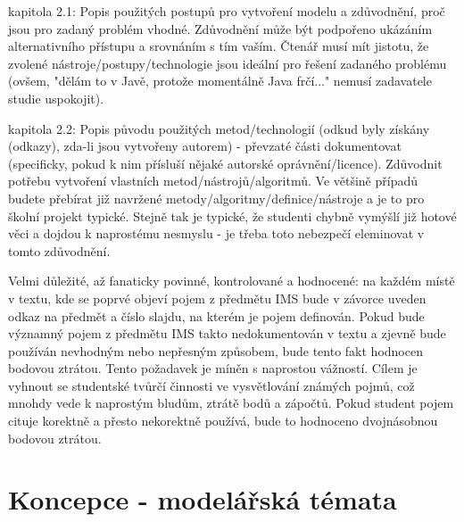 \documentclass[a4paper,11pt]{article}
\begin{document}
kapitola 2.1: Popis použitých postupů pro vytvoření modelu a zdůvodnění, proč jsou pro zadaný problém vhodné. Zdůvodnění může být podpořeno ukázáním alternativního přístupu a srovnáním s tím vaším. Čtenář musí mít jistotu, že zvolené nástroje/postupy/technologie jsou ideální pro řešení zadaného problému (ovšem, "dělám to v Javě, protože momentálně Java frčí..." nemusí zadavatele studie uspokojit).

kapitola 2.2: Popis původu použitých metod/technologií (odkud byly získány (odkazy), zda-li jsou vytvořeny autorem) - převzaté části dokumentovat (specificky, pokud k nim přísluší nějaké autorské oprávnění/licence). Zdůvodnit potřebu vytvoření vlastních metod/nástrojů/algoritmů. Ve většině případů budete přebírat již navržené metody/algoritmy/definice/nástroje a je to pro školní projekt typické. Stejně tak je typické, že studenti chybně vymýšlí již hotové věci a dojdou k naprostému nesmyslu - je třeba toto nebezpečí eleminovat v tomto zdůvodnění.

Velmi důležité, až fanaticky povinné, kontrolované a hodnocené: na každém místě v textu, kde se poprvé objeví pojem z předmětu IMS bude v závorce uveden odkaz na předmět a číslo slajdu, na kterém je pojem definován. Pokud bude významný pojem z předmětu IMS takto nedokumentován v textu a zjevně bude používán nevhodným nebo nepřesným způsobem, bude tento fakt hodnocen bodovou ztrátou. Tento požadavek je míněn s naprostou vážností. Cílem je vyhnout se studentské tvůrčí činnosti ve vysvětlování známých pojmů, což mnohdy vede k naprostým bludům, ztrátě bodů a zápočtů. Pokud student pojem cituje korektně a přesto nekorektně používá, bude to hodnoceno dvojnásobnou bodovou ztrátou.

\section{Koncepce - modelářská témata}
\end{document}
